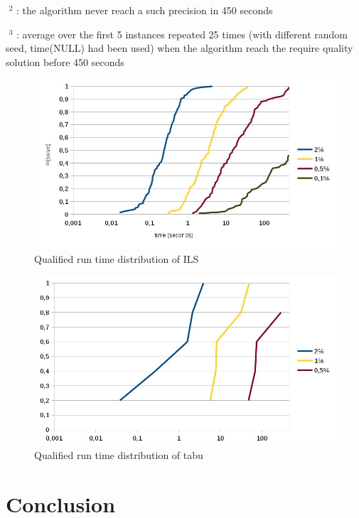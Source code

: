 \documentclass[12pt,a4paper]{article}
\begin{document}
$\text{~}^2$ : the algorithm never reach a such precision in 450 seconds

$\text{~}^3$ : average over the first 5 instances repeated 25 times (with different random seed, time(NULL) had been used) when the algorithm reach the require quality solution before 450 seconds

\begin{figure}[!h]
\centering
\includegraphics[scale=0.5]{Qualified_run_time_distribution.jpg}
\caption{Qualified run time distribution of ILS}
\label{Qualified run time distribution of ILS}
\end{figure}

\begin{figure}[!h]
\centering
\includegraphics[scale=0.5]{Qualified_run_time_distribution2.jpg}
\caption{Qualified run time distribution of tabu}
\label{Qualified run time distribution of tabu}
\end{figure}

\section*{Conclusion}




\end{document}
